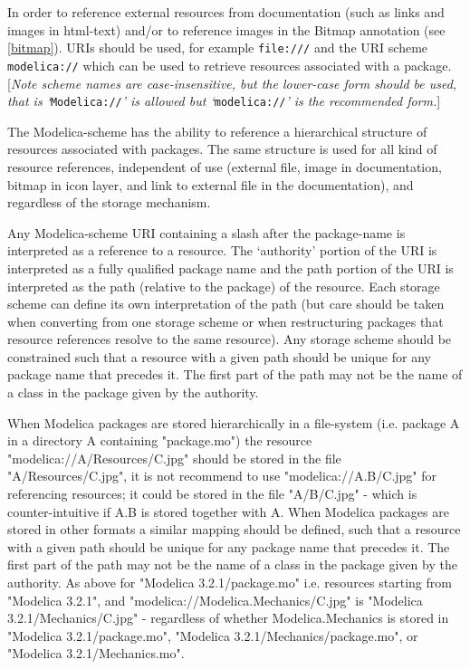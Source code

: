 In order to reference external resources from documentation (such as
links and images in html-text) and/or to reference images in the Bitmap
annotation (see \autoref{bitmap}). URIs should be used, for example
\lstinline[basicstyle=\ttfamily]!file:///! and the URI scheme \lstinline[basicstyle=\ttfamily]!modelica://! which can be used to retrieve
resources associated with a package. {[}\emph{Note scheme names are
case-insensitive, but the lower-case form should be used, that is
`}\lstinline[basicstyle=\ttfamily]!Modelica://!\emph{' is allowed but `}\lstinline[basicstyle=\ttfamily]!modelica://!\emph{' is the
recommended form.}{]}

The Modelica-scheme has the ability to reference a hierarchical
structure of resources associated with packages. The same structure is
used for all kind of resource references, independent of use (external
file, image in documentation, bitmap in icon layer, and link to external
file in the documentation), and regardless of the storage mechanism.

Any Modelica-scheme URI containing a slash after the package-name is
interpreted as a reference to a resource. The `authority' portion of the
URI is interpreted as a fully qualified package name and the path
portion of the URI is interpreted as the path (relative to the package)
of the resource. Each storage scheme can define its own interpretation
of the path (but care should be taken when converting from one storage
scheme or when restructuring packages that resource references resolve
to the same resource). Any storage scheme should be constrained such
that a resource with a given path should be unique for any package name
that precedes it. The first part of the path may not be the name of a
class in the package given by the authority.

When Modelica packages are stored hierarchically in a file-system (i.e.
package A in a directory A containing "package.mo") the resource
"modelica://A/Resources/C.jpg" should be stored in the file
"A/Resources/C.jpg", it is not recommend to use "modelica://A.B/C.jpg"
for referencing resources; it could be stored in the file "A/B/C.jpg" -
which is counter-intuitive if A.B is stored together with A. When
Modelica packages are stored in other formats a similar mapping should
be defined, such that a resource with a given path should be unique for
any package name that precedes it. The first part of the path may not be
the name of a class in the package given by the authority. As above for
"Modelica 3.2.1/package.mo" i.e. resources starting from "Modelica
3.2.1", and "modelica://Modelica.Mechanics/C.jpg" is "Modelica
3.2.1/Mechanics/C.jpg" - regardless of whether Modelica.Mechanics is
stored in "Modelica 3.2.1/package.mo", "Modelica
3.2.1/Mechanics/package.mo", or "Modelica 3.2.1/Mechanics.mo".


